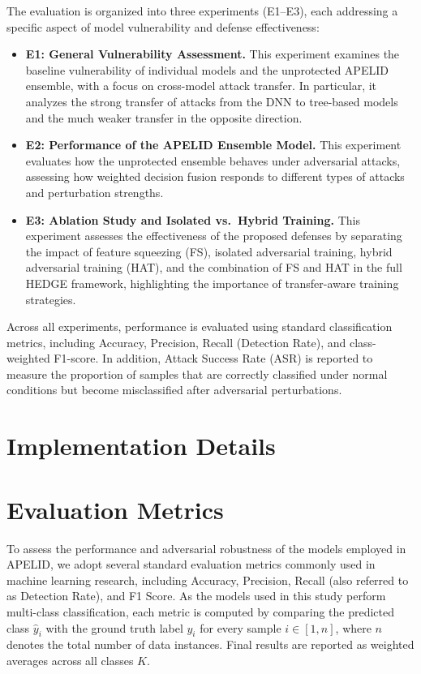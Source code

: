 \documentclass[12pt, a4paper, reqno, oneside]{book}
\begin{document}
The evaluation is organized into three experiments (E1--E3), each addressing a specific aspect of model vulnerability and defense effectiveness:

\begin{itemize}
    \item \textbf{E1: General Vulnerability Assessment.} 
    This experiment examines the baseline vulnerability of individual models and the unprotected APELID ensemble, with a focus on cross-model attack transfer. In particular, it analyzes the strong transfer of attacks from the DNN to tree-based models and the much weaker transfer in the opposite direction.

    \item \textbf{E2: Performance of the APELID Ensemble Model.} 
    This experiment evaluates how the unprotected ensemble behaves under adversarial attacks, assessing how weighted decision fusion responds to different types of attacks and perturbation strengths.

    \item \textbf{E3: Ablation Study and Isolated vs.~Hybrid Training.} 
    This experiment assesses the effectiveness of the proposed defenses by separating the impact of feature squeezing (FS), isolated adversarial training, hybrid adversarial training (HAT), and the combination of FS and HAT in the full HEDGE framework, highlighting the importance of transfer-aware training strategies.
\end{itemize}

Across all experiments, performance is evaluated using standard classification metrics, including Accuracy, Precision, Recall (Detection Rate), and class-weighted F1-score. In addition, Attack Success Rate (ASR) is reported to measure the proportion of samples that are correctly classified under normal conditions but become misclassified after adversarial perturbations.




\section{Implementation Details}


\section{Evaluation Metrics}
\label{sec:metrics}

To assess the performance and adversarial robustness of the models employed in APELID,
we adopt several standard evaluation metrics commonly used in machine learning research,
including Accuracy, Precision, Recall (also referred to as Detection Rate), and F1 Score. As
the models used in this study perform multi-class classification, each metric is computed by
comparing the predicted class $\hat{y}_i$ with the ground truth label $y_i$ for every sample
$i \in [1,n]$, where $n$ denotes the total number of data instances. Final results are reported
as weighted averages across all classes $K$.
\end{document}
